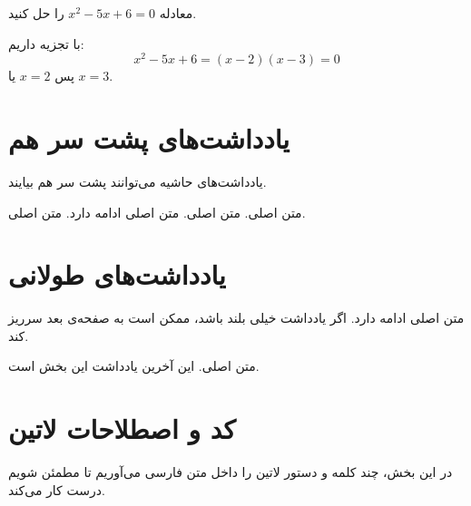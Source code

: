 \documentclass{matinbook}
\begin{document}
\begin{example}
    معادله $x^2 - 5x + 6 = 0$ را حل کنید.
    \label{ex:quadratic}
\end{example}


\begin{solution}
    با تجزیه داریم:
    \[
    x^2 - 5x + 6 = (x - 2)(x - 3) = 0
    \]
    پس $x = 2$ یا $x = 3$.
\end{solution}


\section{یادداشت‌های پشت سر هم}
\label{sec:consecutive-notes}

یادداشت‌های حاشیه می‌توانند پشت سر هم بیایند.

متن اصلی.  متن اصلی.
 متن اصلی ادامه دارد.
متن اصلی. 

\section{یادداشت‌های طولانی}
\label{sec:long-notes}

متن اصلی ادامه دارد. اگر یادداشت خیلی بلند باشد، ممکن است
به صفحه‌ی بعد سرریز کند.

متن اصلی. این آخرین یادداشت این بخش است.

\section{کد و اصطلاحات لاتین}
\label{sec:latin}

در این بخش، چند کلمه و دستور لاتین را داخل متن فارسی
می‌آوریم تا مطمئن شویم  درست کار می‌کند.
\end{document}
